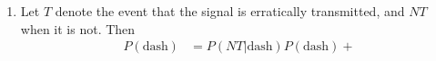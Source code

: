 \documentclass{article}
\begin{document}
\begin{enumerate}
    \begin{enumerate}
        \item Let $T$ denote the event that the signal is erratically transmitted, and $NT$ when 
        it is not. Then 
        \begin{align*}
            P(\text{dash})
            &= P(NT|\text{dash})P(\text{dash}) + 
        \end{align*}
    \end{enumerate}
\end{enumerate}
\end{document}
